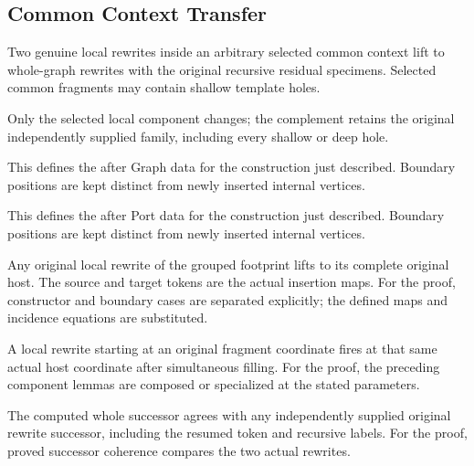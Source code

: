 \subsection{Common Context Transfer}
Two genuine local rewrites inside an arbitrary selected common context lift to whole-graph rewrites with the original recursive residual specimens. Selected common fragments may contain shallow template holes.

Only the selected local component changes; the complement retains the original independently supplied family, including every shallow or deep hole.
\par{}

This defines the after Graph data for the construction just described. Boundary positions are kept distinct from newly inserted internal vertices.
\par{}

This defines the after Port data for the construction just described. Boundary positions are kept distinct from newly inserted internal vertices.
\par{}

Any original local rewrite of the grouped footprint lifts to its complete original host. The source and target tokens are the actual insertion maps.
For the proof, constructor and boundary cases are separated explicitly; the defined maps and incidence equations are substituted.
\par{}

A local rewrite starting at an original fragment coordinate fires at that same actual host coordinate after simultaneous filling.
For the proof, the preceding component lemmas are composed or specialized at the stated parameters.
\par{}

The computed whole successor agrees with any independently supplied original rewrite successor, including the resumed token and recursive labels.
For the proof, proved successor coherence compares the two actual rewrites.
\par{}

